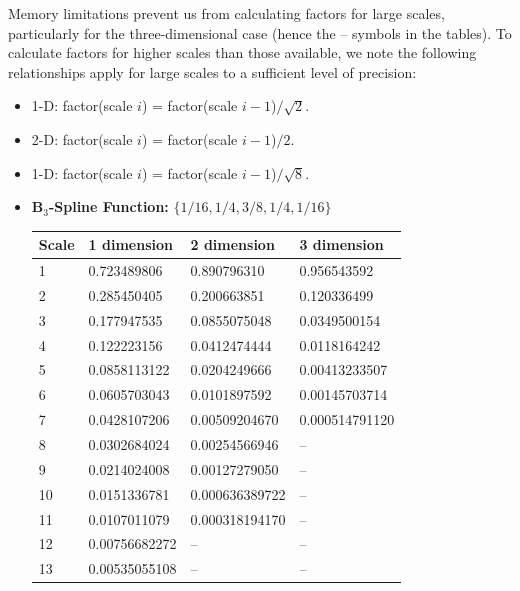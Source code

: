 \documentclass[12pt,a4paper]{article}
\begin{document}
Memory limitations prevent us from calculating factors for large
scales, particularly for the three-dimensional case (hence the --
symbols in the tables). To calculate factors for
higher scales than those available, we note the following
relationships apply for large scales to a sufficient level of precision:
\begin{itemize}
\item 1-D: factor(scale $i$) = factor(scale $i-1$)$/\sqrt{2}$.
\item 2-D: factor(scale $i$) = factor(scale $i-1$)$/2$.
\item 1-D: factor(scale $i$) = factor(scale $i-1$)$/\sqrt{8}$.
\end{itemize}

\newpage
\begin{itemize}
\item {\bf B$_3$-Spline Function:} $\{1/16,1/4,3/8,1/4,1/16\}$

\begin{tabular}{llll}
Scale & 1 dimension      & 2 dimension     & 3 dimension\\ \hline
1     & 0.723489806      & 0.890796310     & 0.956543592\\
2     & 0.285450405	 & 0.200663851	   & 0.120336499\\
3     & 0.177947535	 & 0.0855075048	   & 0.0349500154\\
4     & 0.122223156	 & 0.0412474444	   & 0.0118164242\\
5     & 0.0858113122	 & 0.0204249666	   & 0.00413233507\\
6     & 0.0605703043	 & 0.0101897592	   & 0.00145703714\\
7     & 0.0428107206	 & 0.00509204670   & 0.000514791120\\
8     & 0.0302684024	 & 0.00254566946   & --\\
9     & 0.0214024008	 & 0.00127279050   & --\\
10    & 0.0151336781	 & 0.000636389722  & --\\
11    & 0.0107011079	 & 0.000318194170  & --\\
12    & 0.00756682272	 & --		   & --\\
13    & 0.00535055108	 & --		   & --\\
\end{tabular}


\end{itemize}
\end{document}
